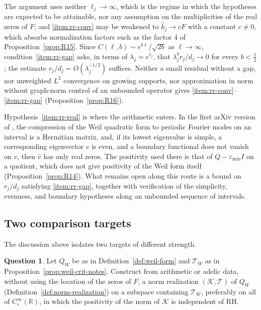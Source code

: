 \documentclass[11pt]{amsart}
\theoremstyle{plain}
\theoremstyle{definition}
\newtheorem{question}[theorem]{Question}
\theoremstyle{remark}
\numberwithin{equation}{section}
\newcommand{\R}{\mathbb{R}}
\begin{document}
The argument uses neither $\ell_j\to\infty$, which is the regime in
which the hypotheses are expected to be attainable, nor any assumption
on the multiplicities of the real zeros of $F$; and \ref{item:rr-conv}
may be weakened to $\widehat k_j\to cF$ with a constant $c\ne0$, which
absorbs normalization factors such as the factor $4$ of
Proposition~\ref{prop:R15}. Since $C(\ell,b)\sim e^{b\ell}/\sqrt{2b}$ as
$\ell\to\infty$, condition~\ref{item:rr-gap} asks, in terms of
$\lambda_j=e^{\ell_j}$, that $\lambda_j^br_j/d_j\to0$ for every
$b<\tfrac12$; the estimate $r_j/d_j=O(\lambda_j^{-1/2})$ suffices.
Neither a small residual without a gap, nor unweighted $L^2$
convergence on growing supports, nor approximation in norm without
graph-norm control of an unbounded operator gives
\ref{item:rr-conv}--\ref{item:rr-gap} (Proposition~\ref{prop:R16}).

Hypothesis~\ref{item:rr-real} is where the arithmetic enters. In the
first arXiv version of \cite[Theorem~5.10]
{ConnesConsaniMoscovici2025ZetaTriples}, the compression of the Weil
quadratic form to periodic Fourier modes on an interval is a Hermitian
matrix, and, if its lowest eigenvalue is simple, a corresponding
eigenvector $v$ is even, and a boundary functional does not vanish on
$v$, then $\widehat v$ has only real zeros. The positivity used there is
that of $Q-\varepsilon_{\min}I$ on a quotient, which does not give
positivity of the Weil form itself (Proposition~\ref{prop:R14}). What
remains open along this route is a bound on $r_j/d_j$ satisfying
\ref{item:rr-gap}, together with verification of the simplicity,
evenness, and boundary hypotheses along an unbounded sequence of
intervals.

\subsection{Two comparison targets}\label{subsec:targets}

The discussion above isolates two targets of different strength.

\begin{question}\label{q:norm-target}
Let $Q_W$ be as in Definition~\ref{def:weil-form} and $\mathcal T_W$
as in Proposition~\ref{prop:weil-crit-notes}. Construct from arithmetic or
adelic data, without using the location of the zeros of $F$, a norm
realization $(\mathcal K,\mathcal T)$ of $Q_W$
(Definition~\ref{def:norm-realization}) on a subspace containing
$\mathcal T_W$, preferably on all of $C_c^\infty(\R)$, in which the
positivity of the norm of $\mathcal K$ is independent of RH.
\end{question}
\end{document}
